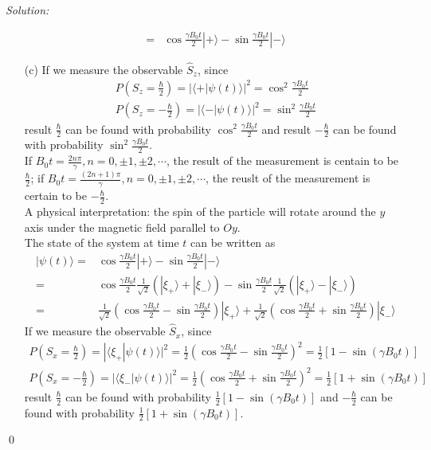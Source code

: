 \documentclass[12pt,a4paper]{article}
\newenvironment{sol}
    {\emph{Solution:}
    }
    {
    \qed
    }
\begin{document}
\begin{sol}
\begin{itemize}
\begin{align}
=&\cos\frac{\gamma B_0t}{2}|+\rangle-\sin\frac{\gamma B_0t}{2}|-\rangle
\end{align}\normalsize
\item[(c)] If we measure the observable $\hat{S}_z$, since
\begin{gather}
P(S_z=\frac{\hbar}{2})=|\langle+|\psi(t)\rangle|^2=\cos^2\frac{\gamma B_0t}{2}\\
P(S_z=-\frac{\hbar}{2})=|\langle-|\psi(t)\rangle|^2=\sin^2\frac{\gamma B_0t}{2}
\end{gather}
result $\frac{\hbar}{2}$ can be found with probability $\cos^2\frac{\gamma B_0t}{2}$ and result $-\frac{\hbar}{2}$ can be found with probability $\sin^2\frac{\gamma B_0t}{2}$.\\
If $B_0t=\frac{2n\pi}{\gamma},n=0,\pm1,\pm2,\cdots$, the result of the measurement is centain to be $\frac{\hbar}{2}$; if $B_0t=\frac{(2n+1)\pi}{\gamma},n=0,\pm1,\pm2,\cdots$, the reuslt of the measurement is certain to be $-\frac{\hbar}{2}$.\\
A physical interpretation: the spin of the particle will rotate around the $y$ axis under the magnetic field parallel to $Oy$.\\
The state of the system at time $t$ can be written as
\begin{align}
\nonumber|\psi(t)\rangle=&\cos\frac{\gamma B_0t}{2}|+\rangle-\sin\frac{\gamma B_0t}{2}|-\rangle\\
\nonumber=&\cos\frac{\gamma B_0t}{2}\frac{1}{\sqrt{2}}(|\xi_+\rangle+|\xi_-\rangle)-\sin\frac{\gamma B_0t}{2}\frac{1}{\sqrt{2}}(|\xi_+\rangle-|\xi_-\rangle)\\
=&\frac{1}{\sqrt{2}}(\cos\frac{\gamma B_0t}{2}-\sin\frac{\gamma B_0t}{2})|\xi_+\rangle+\frac{1}{\sqrt{2}}(\cos\frac{\gamma B_0t}{2}+\sin\frac{\gamma B_0t}{2})|\xi_-\rangle
\end{align}
If we measure the observable $\hat{S}_x$, since
\begin{gather}
P(S_x=\frac{\hbar}{2})=|\langle\xi_+|\psi(t)\rangle|^2=\frac{1}{2}(\cos\frac{\gamma B_0t}{2}-\sin\frac{\gamma B_0t}{2})^2=\frac{1}{2}[1-\sin(\gamma B_0t)]\\
P(S_x=-\frac{\hbar}{2})=|\langle\xi_-|\psi(t)\rangle|^2=\frac{1}{2}(\cos\frac{\gamma B_0t}{2}+\sin\frac{\gamma B_0t}{2})^2=\frac{1}{2}[1+\sin(\gamma B_0t)]
\end{gather}
result $\frac{\hbar}{2}$ can be found with probability $\frac{1}{2}[1-\sin(\gamma B_0t)]$ and $-\frac{\hbar}{2}$ can be found with probability $\frac{1}{2}[1+\sin(\gamma B_0t)]$.\\

\end{itemize}
\end{sol}
\end{document}
